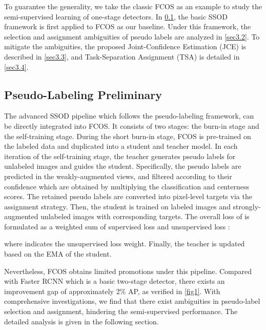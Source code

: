 \documentclass[10pt,twocolumn,letterpaper]{article}
\begin{document}
To guarantee the generality, we take the classic FCOS\cite{Fcos} as an example to study the semi-supervised learning of one-stage detectors.
In \cref{sec3.1}, the basic SSOD framework is first applied to FCOS as our baseline.
Under this framework, the selection and assignment ambiguities of pseudo labels are analyzed in \cref{sec3.2}.
To mitigate the ambiguities, the proposed Joint-Confidence Estimation (JCE) is described in \cref{sec3.3}, and Task-Separation Assignment (TSA) is detailed in \cref{sec3.4}.


\subsection{Pseudo-Labeling Preliminary}
\label{sec3.1}

The advanced SSOD pipeline which follows the pseudo-labeling framework\cite{UnbiasedTeacher}, can be directly integrated into FCOS.
It consists of two stages: the burn-in stage and the self-training stage.
During the short burn-in stage, FCOS is pre-trained on the labeled data and duplicated into a student and teacher model.
In each iteration of the self-training stage, the teacher generates pseudo labels for unlabeled images and guides the student.
Specifically, the pseudo labels are predicted in the weakly-augmented views, and filtered according to their confidence which are obtained by multiplying the classification and centerness scores.
The retained pseudo labels are converted into pixel-level targets via the assignment strategy.
Then, the student is trained on labeled images and strongly-augmented unlabeled images with corresponding targets.
The overall loss  of is formulated as a weighted sum of supervised loss  and unsupervised loss :

where  indicates the unsupervised loss weight.
Finally, the teacher is updated based on the EMA of the student.

Nevertheless, FCOS obtains limited promotions under this pipeline. 
Compared with Faster RCNN which is a basic two-stage detector, there exists an improvement gap of approximately 2\% AP, as verified in \cref{fig1}.
With comprehensive investigations, we find that there exist ambiguities in pseudo-label selection and assignment, hindering the semi-supervised performance.
The detailed analysis is given in the following section.
\end{document}
